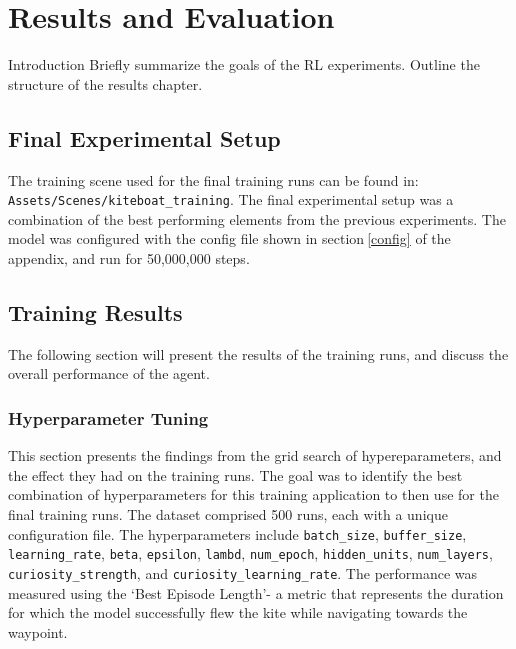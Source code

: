 

\let\textcircled=\pgftextcircled\chapter{Results and Evaluation}\label{chap:results}

Introduction
Briefly summarize the goals of the RL experiments.
Outline the structure of the results chapter.

\section{Final Experimental Setup}
The training scene used for the final training runs can be found in:
\newline
\texttt{Assets/Scenes/kiteboat\_training}. The final experimental setup was a combination of the best performing elements from the previous experiments. The model was configured with the config file shown in section$~$\ref{config} of the appendix, and run for 50,000,000 steps.



\section{Training Results}

The following section will present the results of the training runs, and discuss the overall performance of the agent. 

\subsection{Hyperparameter Tuning}\label{sec:hyperparameter_tuning}

This section presents the findings from the grid search of hypereparameters, and the effect they had on the training runs. The goal was to identify the best combination of hyperparameters for this training application to then use for the final training runs. The dataset comprised 500 runs, each with a unique configuration file. The hyperparameters include \texttt{batch\_size}, \texttt{buffer\_size}, \texttt{learning\_rate}, \texttt{beta}, \texttt{epsilon}, \texttt{lambd}, \texttt{num\_epoch}, \texttt{hidden\_units}, \texttt{num\_layers}, \texttt{curiosity\_strength}, and \texttt{curiosity\_learning\_rate}. The performance was measured using the `Best Episode Length'- a metric that represents the duration for which the model successfully flew the kite while navigating towards the waypoint. 

